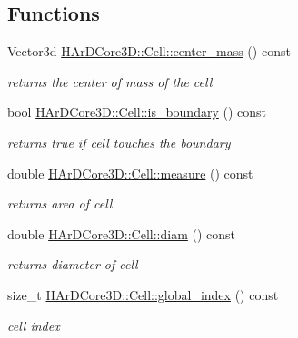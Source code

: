\subsection*{Functions}
\begin{DoxyCompactItemize}
\item 
\mbox{\label{group__Mesh_ga3eb9c83b9578d3d93e94a698c37a980e}} 
Vector3d \hyperlink{group__Mesh_ga3eb9c83b9578d3d93e94a698c37a980e}{H\+Ar\+D\+Core3\+D\+::\+Cell\+::center\+\_\+mass} () const
\begin{DoxyCompactList}\small\item\em returns the center of mass of the cell \end{DoxyCompactList}\item 
\mbox{\label{group__Mesh_gab401dd009e7f13008b03cc2080d93449}} 
bool \hyperlink{group__Mesh_gab401dd009e7f13008b03cc2080d93449}{H\+Ar\+D\+Core3\+D\+::\+Cell\+::is\+\_\+boundary} () const
\begin{DoxyCompactList}\small\item\em returns true if cell touches the boundary \end{DoxyCompactList}\item 
\mbox{\label{group__Mesh_ga75b939b8edadf100a35b9c7298fb5c8b}} 
double \hyperlink{group__Mesh_ga75b939b8edadf100a35b9c7298fb5c8b}{H\+Ar\+D\+Core3\+D\+::\+Cell\+::measure} () const
\begin{DoxyCompactList}\small\item\em returns area of cell \end{DoxyCompactList}\item 
\mbox{\label{group__Mesh_ga02b7103a8ceae610aa213334a6a1277d}} 
double \hyperlink{group__Mesh_ga02b7103a8ceae610aa213334a6a1277d}{H\+Ar\+D\+Core3\+D\+::\+Cell\+::diam} () const
\begin{DoxyCompactList}\small\item\em returns diameter of cell \end{DoxyCompactList}\item 
\mbox{\label{group__Mesh_ga76cf6e2785020ff1cc8ec51bf4d232c5}} 
size\+\_\+t \hyperlink{group__Mesh_ga76cf6e2785020ff1cc8ec51bf4d232c5}{H\+Ar\+D\+Core3\+D\+::\+Cell\+::global\+\_\+index} () const
\begin{DoxyCompactList}\small\item\em cell index \end{DoxyCompactList}\item 

\end{DoxyCompactItemize}
